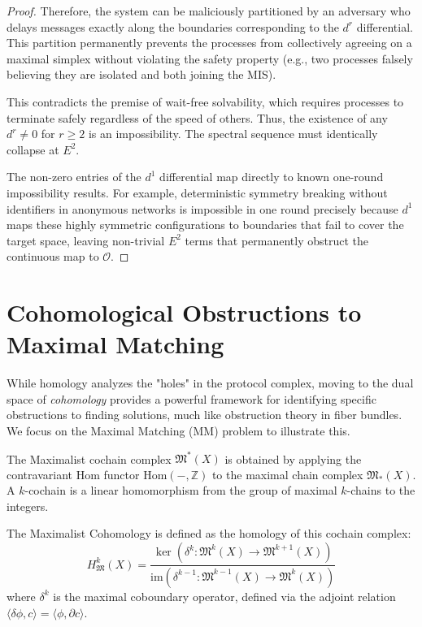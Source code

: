 \begin{proof}
Therefore, the system can be maliciously partitioned by an adversary who delays messages exactly along the boundaries corresponding to the $d^r$ differential. This partition permanently prevents the processes from collectively agreeing on a maximal simplex without violating the safety property (e.g., two processes falsely believing they are isolated and both joining the MIS).

This contradicts the premise of wait-free solvability, which requires processes to terminate safely regardless of the speed of others. Thus, the existence of any $d^r \neq 0$ for $r \ge 2$ is an impossibility. The spectral sequence must identically collapse at $E^2$.

The non-zero entries of the $d^1$ differential map directly to known one-round impossibility results. For example, deterministic symmetry breaking without identifiers in anonymous networks is impossible in one round precisely because $d^1$ maps these highly symmetric configurations to boundaries that fail to cover the target space, leaving non-trivial $E^2$ terms that permanently obstruct the continuous map to $\mathcal{O}$.
\end{proof}

\section{Cohomological Obstructions to Maximal Matching}

While homology analyzes the "holes" in the protocol complex, moving to the dual space of \textit{cohomology} provides a powerful framework for identifying specific obstructions to finding solutions, much like obstruction theory in fiber bundles. We focus on the Maximal Matching (MM) problem to illustrate this.

\begin{definition}
The Maximalist cochain complex $\mathfrak{M}^*(X)$ is obtained by applying the contravariant Hom functor $\text{Hom}(-,\mathbb{Z})$ to the maximal chain complex $\mathfrak{M}_*(X)$. A $k$-cochain is a linear homomorphism from the group of maximal $k$-chains to the integers. 

The Maximalist Cohomology is defined as the homology of this cochain complex:
\[
H^k_{\mathfrak{M}}(X) = \frac{\ker(\delta^k: \mathfrak{M}^k(X) \to \mathfrak{M}^{k+1}(X))}{\text{im}(\delta^{k-1}: \mathfrak{M}^{k-1}(X) \to \mathfrak{M}^k(X))}
\]
where $\delta^k$ is the maximal coboundary operator, defined via the adjoint relation $\langle \delta \phi, c \rangle = \langle \phi, \partial c \rangle$.
\end{definition}

